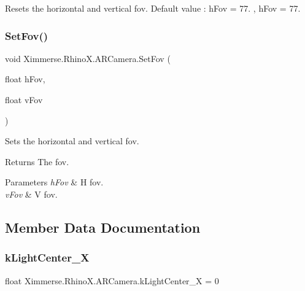 Resets the horizontal and vertical fov. Default value \+: h\+Fov = 77. , h\+Fov = 77. 

\mbox{\label{class_ximmerse_1_1_rhino_x_1_1_a_r_camera_aefc6422a8587e8769e5e224c2ce66148}} 
\subsubsection{\texorpdfstring{Set\+Fov()}{SetFov()}}
{\footnotesize\ttfamily void Ximmerse.\+Rhino\+X.\+A\+R\+Camera.\+Set\+Fov (\begin{DoxyParamCaption}\item[{float}]{h\+Fov,  }\item[{float}]{v\+Fov }\end{DoxyParamCaption})}



Sets the horizontal and vertical fov. 

\begin{DoxyReturn}{Returns}
The fov.
\end{DoxyReturn}

\begin{DoxyParams}{Parameters}
{\em h\+Fov} & H fov.\\
\hline
{\em v\+Fov} & V fov.\\
\hline
\end{DoxyParams}


\subsection{Member Data Documentation}
\mbox{\label{class_ximmerse_1_1_rhino_x_1_1_a_r_camera_ae47108706cc7216eaa7dd50ffbef8851}} 
\subsubsection{\texorpdfstring{k\+Light\+Center\+\_\+X}{kLightCenter\_X}}
{\footnotesize\ttfamily float Ximmerse.\+Rhino\+X.\+A\+R\+Camera.\+k\+Light\+Center\+\_\+X = 0\hspace{0.3cm}{\ttfamily [static]}}



